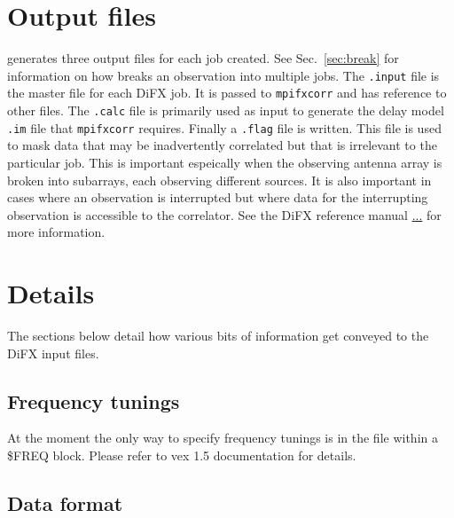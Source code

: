 \documentclass[12pt]{article}
\begin{document}
\section{Output files}

\vexdifx generates three output files for each job created.
See Sec.~\ref{sec:break} for information on how \vexdifx breaks an observation into multiple jobs.
The {\tt .input} file is the master file for each DiFX job.
It is passed to {\tt mpifxcorr} and has reference to other files.
The {\tt .calc} file is primarily used as input to generate the delay model {\tt .im} file that {\tt mpifxcorr} requires.
Finally a {\tt .flag} file is written.
This file is used to mask data that may be inadvertently correlated but that is irrelevant to the particular job.
This is important espeically when the observing antenna array is broken into subarrays, each observing different sources.
It is also important in cases where an observation is interrupted but where data for the interrupting observation is accessible to the correlator.
See the DiFX reference manual \url{...} for more information.

\section{Details}

The sections below detail how various bits of information get conveyed to the DiFX input files.

\subsection{Frequency tunings}

At the moment the only way to specify frequency tunings is in the \vx file within a \$FREQ block.
Please refer to vex 1.5 documentation for details.

\subsection{Data format}
\end{document}
